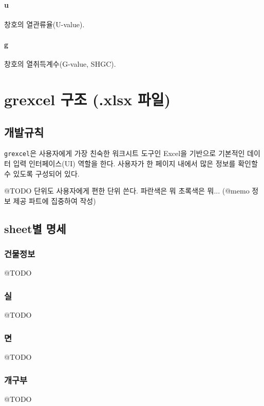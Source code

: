 \paragraph{u} 창호의 열관류율(U-value).

\paragraph{g} 창호의 열취득계수(G-value, SHGC).


\section{grexcel 구조 (.xlsx 파일)}
\subsection{개발규칙}
\texttt{grexcel}은 사용자에게 가장 친숙한 워크시트 도구인 Excel을 기반으로 
기본적인 데이터 입력 인터페이스(UI) 역할을 한다. 사용자가 한 페이지 내에서 많은 정보를 확인할 수 있도록 구성되어 있다.
\par
@TODO 
단위도 사용자에게 편한 단위 쓴다. 파란색은 뭐 초록색은 뭐... (@memo 정보 제공 파트에 집중하여 작성)

\subsection{sheet별 명세}
\subsubsection{건물정보}
@TODO

\subsubsection{실}
@TODO

\subsubsection{면}
@TODO

\subsubsection{개구부}
@TODO

